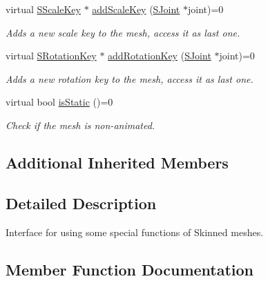 \begin{DoxyCompactItemize}
\mbox{\label{classirr_1_1scene_1_1ISkinnedMesh_a3601a01c99594fe8db3cccaec89df7d6}} 
virtual \hyperlink{structirr_1_1scene_1_1ISkinnedMesh_1_1SScaleKey}{S\+Scale\+Key} $\ast$ \hyperlink{classirr_1_1scene_1_1ISkinnedMesh_a3601a01c99594fe8db3cccaec89df7d6}{add\+Scale\+Key} (\hyperlink{structirr_1_1scene_1_1ISkinnedMesh_1_1SJoint}{S\+Joint} $\ast$joint)=0
\begin{DoxyCompactList}\small\item\em Adds a new scale key to the mesh, access it as last one. \end{DoxyCompactList}\item 
\mbox{\label{classirr_1_1scene_1_1ISkinnedMesh_ab5d41c1fc22de5d7cb9c376d2a873ab9}} 
virtual \hyperlink{structirr_1_1scene_1_1ISkinnedMesh_1_1SRotationKey}{S\+Rotation\+Key} $\ast$ \hyperlink{classirr_1_1scene_1_1ISkinnedMesh_ab5d41c1fc22de5d7cb9c376d2a873ab9}{add\+Rotation\+Key} (\hyperlink{structirr_1_1scene_1_1ISkinnedMesh_1_1SJoint}{S\+Joint} $\ast$joint)=0
\begin{DoxyCompactList}\small\item\em Adds a new rotation key to the mesh, access it as last one. \end{DoxyCompactList}\item 
\mbox{\label{classirr_1_1scene_1_1ISkinnedMesh_a2131a8693a84e29036ffff69955a2ec1}} 
virtual bool \hyperlink{classirr_1_1scene_1_1ISkinnedMesh_a2131a8693a84e29036ffff69955a2ec1}{is\+Static} ()=0
\begin{DoxyCompactList}\small\item\em Check if the mesh is non-\/animated. \end{DoxyCompactList}\end{DoxyCompactItemize}
\subsection*{Additional Inherited Members}


\subsection{Detailed Description}
Interface for using some special functions of Skinned meshes. 

\subsection{Member Function Documentation}
\mbox{\label{classirr_1_1scene_1_1ISkinnedMesh_ae63f3f1a74bf38c4b5113e3a5b96c0f3}} 
